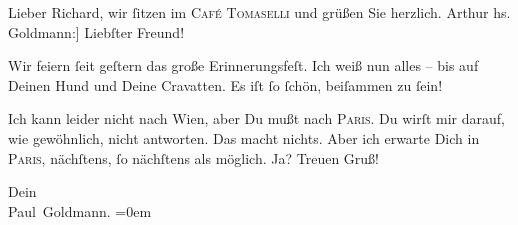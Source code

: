 \pstart{}Lieber Richard,\pend\vspace{0.5em}
\pstart
           wir{ }ſitzen im \textsc{Café Tomaselli} und grüßen Sie herzlich.\pend
           \pstart \spacefill\mbox{Arthur}\pend{}\vspace{1em}
\pstart
           \noindent{}{[}hs. Goldmann:{]} Liebſter Freund!\pend
           
\pstart
           Wir feiern{ }ſeit geſtern das große Erinnerungsfeſt. Ich weiß nun alles – bis auf
               Deinen Hund und Deine Cravatten. Es iſt{ }ſo{ }ſchön, beiſammen zu{ }ſein!\pend
           
\pstart
           Ich kann leider nicht nach Wien, aber Du mußt nach
                  \textsc{Paris}. Du wirſt mir darauf, wie gewöhnlich, nicht antworten. Das macht nichts. Aber
               ich  erwarte Dich in \textsc{Paris}, nächſtens,{ }ſo nächſtens als möglich. Ja? Treuen Gruß!\pend
           
\pstart
           Dein{\\[\baselineskip]}\spacefill\mbox{Paul Goldmann.}\pend
           \leftskip=0em{}\endnumbering{}  \newcommand{\dateiname}{L00264}\newcommand{\titel}{Arthur Schnitzler und Paul Goldmann an Richard Beer-Hofmann, 18. 9. 1893}\newcommand{\editorInnen}{Martin Anton Müller und Gerd-Hermann Susen}

